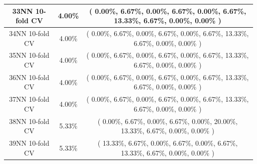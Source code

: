 \documentclass[11pt,a4paper]{article}
\begin{document}
\begin{center}
\begin{tabular} {|| c | c | c ||}
33NN 10-fold CV & 4.00\% & ( 0.00\%, 6.67\%, 0.00\%, 6.67\%, 0.00\%, 6.67\%, 13.33\%, 6.67\%, 0.00\%, 0.00\% ) \\ \hline
34NN 10-fold CV & 4.00\% & ( 0.00\%, 6.67\%, 0.00\%, 6.67\%, 0.00\%, 6.67\%, 13.33\%, 6.67\%, 0.00\%, 0.00\% ) \\ \hline
35NN 10-fold CV & 4.00\% & ( 0.00\%, 6.67\%, 0.00\%, 6.67\%, 0.00\%, 6.67\%, 13.33\%, 6.67\%, 0.00\%, 0.00\% ) \\ \hline
36NN 10-fold CV & 4.00\% & ( 0.00\%, 6.67\%, 0.00\%, 6.67\%, 0.00\%, 6.67\%, 13.33\%, 6.67\%, 0.00\%, 0.00\% ) \\ \hline
37NN 10-fold CV & 4.00\% & ( 0.00\%, 6.67\%, 0.00\%, 6.67\%, 0.00\%, 6.67\%, 13.33\%, 6.67\%, 0.00\%, 0.00\% ) \\ \hline
38NN 10-fold CV & 5.33\% & ( 0.00\%, 6.67\%, 0.00\%, 6.67\%, 0.00\%, 20.00\%, 13.33\%, 6.67\%, 0.00\%, 0.00\% ) \\ \hline
39NN 10-fold CV & 5.33\% & ( 13.33\%, 6.67\%, 0.00\%, 6.67\%, 0.00\%, 6.67\%, 13.33\%, 6.67\%, 0.00\%, 0.00\% ) \\ \hline
    \end{tabular}
\end{center}
\newpage
\end{document}
